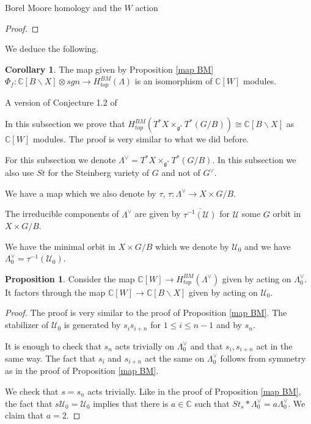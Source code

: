 \documentclass[12pt]{article}
\newcommand{\C}{\mathbb{C}}
\newcommand{\<}{\langle}
\renewcommand{\>}{\rangle}
\theoremstyle{plain}
\theoremstyle{definition}
\newtheorem{prop}[theorem]{Proposition}
\newtheorem{cor}[theorem]{Corollary}
\begin{document}
\begin{section}{Borel Moore homology and the $W$ action}
\begin{proof}
    
\end{proof}

We deduce the following.
\begin{cor} The map given by Proposition \ref{map BM} $\Phi_f:\C[B\backslash X]\otimes sgn\rightarrow H_{top}^{BM}(\Lambda)$ is an isomorphism of $\C[W]$ modules.
\end{cor}

\begin{subsection}{A version of Conjecture 1.2 of \cite{finkelberg2023lagrangiansubvarietieshypersphericalvarieties}}

In this subsection we prove that $H_{top}^{BM}(T^*X\times_{\mathfrak{g}^{*}}T^*(G/B))\cong \C[B\backslash X]$ as $\C[W]$ modules. The proof is very similar to what we did before.

For this subsection we denote  $\Lambda^\vee=T^*X\times_{\mathfrak{g}^{*}}T^*(G/B)$. In this subsection we also use $St$ for the Steinberg variety of $G$ and not of $G^\vee$.

We have a map which we also denote by $\tau$, $\tau:\Lambda^\vee\rightarrow X\times G/B$.

The irreducible components of $\Lambda^\vee$ are given by $\overline{\tau^{-1}(\mathcal{U})}$ for $\mathcal{U}$ some $G$ orbit in $X\times G/B$. 

We have the minimal orbit in $X\times G/B$ which we denote by $\mathcal{U}_0$ and we have $\Lambda^\vee_0=\tau^{-1}(\mathcal{U}_0)$.

\begin{prop}
    Consider the map $\C[W]\rightarrow H_{top}^{BM}(\Lambda^\vee)$ given by acting on $\Lambda^\vee_0$. It factors through the map $\C[W]\rightarrow \C[B\backslash X]$ given by acting on $\mathcal{U}_0$. 
\end{prop}

\begin{proof}
    The proof is very similar to the proof of Proposition \ref{map BM}. The stabilizer of $\mathcal{U}_0$ is generated by $s_is_{i+n}$ for $1\leq i\leq n-1$ and by $s_{n}$.

    It is enough to check that $s_n$ acts trivially on $\Lambda^\vee_0$ and that $s_i,s_{i+n}$ act in the same way. The fact that $s_i$ and $s_{i+n}$ act the same on $\Lambda^\vee_0$ follows from symmetry as in the proof of Proposition \ref{map BM}. 

    We check that $s=s_n$ acts trivially. Like in the proof of Proposition \ref{map BM}, the fact that $s\mathcal{U}
    _0=\mathcal{U}
    _0$ implies that there is $a\in \C$ such that $St_s*\Lambda^\vee_0=a\Lambda^\vee_0$. We claim that $a=2$.


\end{proof}
\end{subsection}
\end{section}
\end{document}
